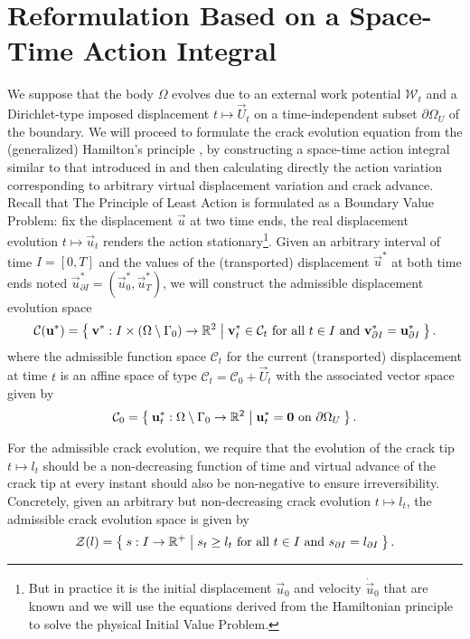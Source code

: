 \section{Reformulation Based on a Space-Time Action Integral} \label{sec:reformulationtheta}
We suppose that the body $\Omega$ evolves due to an external work potential $\mathcal{W}_t$ and a Dirichlet-type imposed displacement $t\mapsto\vec{U}_t$ on a time-independent subset $\partial\Omega_U$ of the boundary. We will proceed to formulate the crack evolution equation from the (generalized) Hamilton's principle \cite{Hamilton:1834}, by constructing a space-time action integral similar to that introduced in \cite{Adda-BediaAriasAmarLund:1999} and then calculating directly the action variation corresponding to arbitrary virtual displacement variation and crack advance. Recall that The Principle of Least Action is formulated as a Boundary Value Problem: fix the displacement $\vec{u}$ at two time ends, the real displacement evolution $t\mapsto\vec{u}_t$ renders the action stationary\footnote{But in practice it is the initial displacement $\vec{u}_0$ and velocity $\dot{\vec{u}}_0$ that are known and we will use the equations derived from the Hamiltonian principle to solve the physical Initial Value Problem.}. Given an arbitrary interval of time $I=[0,T]$ and the values of the (transported) displacement $\vec{u}^*$ at both time ends noted $\vec{u}^*_{\partial I}=(\vec{u}^*_0,\vec{u}^*_T)$, we will construct the admissible displacement evolution space
\begin{equation} \label{eq:Cu}
\mathcal{C}(\vec{u}^*)=\set{\vec{v}^*:I\times(\domaini)\to\mathbb{R}^2|\vec{v}_t^*\in\mathcal{C}_t\text{ for all $t\in I$ and }\vec{v}^*_{\partial I}=\vec{u}^*_{\partial I}}.
\end{equation}
where the admissible function space $\mathcal{C}_t$ for the current (transported) displacement at time $t$ is an affine space of type $\mathcal{C}_t=\mathcal{C}_0+\vec{U}_t$ with the associated vector space given by
\[
\mathcal{C}_0=\set{\vec{u}^*_t:\domaini\to\mathbb{R}^2|\vec{u}^*_t=\vec{0}\text{ on }\partial\Omega_U}.
\]

For the admissible crack evolution, we require that the evolution of the crack tip $t\mapsto l_t$ should be a non-decreasing function of time and virtual advance of the crack tip at every instant should also be non-negative to ensure irreversibility. Concretely, given an arbitrary but non-decreasing crack evolution $t\mapsto l_t$, the admissible crack evolution space is given by
\begin{equation} \label{eq:Dl}
\mathcal{Z}(l)=\Set{s:I\to\mathbb{R}^+|s_t\geq l_t\text{ for all $t\in I$ and }s_{\partial I}=l_{\partial I}}.
\end{equation}

